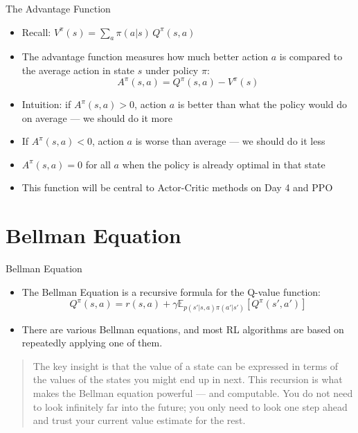 \begin{frame}{The Advantage Function}
\begin{itemize}
    \item Recall: $V^{\pi}(s) = \sum_a \pi(a|s)\, Q^{\pi}(s,a)$
    \item The advantage function measures how much better action $a$ is compared to the average action in state $s$ under policy $\pi$:
    $$A^{\pi}(s,a) = Q^{\pi}(s,a) - V^{\pi}(s)$$
    \item Intuition: if $A^{\pi}(s,a) > 0$, action $a$ is better than what the policy would do on average --- we should do it more
    \item If $A^{\pi}(s,a) < 0$, action $a$ is worse than average --- we should do it less
    \item $A^{\pi}(s,a) = 0$ for all $a$ when the policy is already optimal in that state
    \item This function will be central to Actor-Critic methods on Day 4 and PPO
\end{itemize}
\end{frame}

\section{Bellman Equation}
\begin{frame}{Bellman Equation}
\begin{itemize}
    \item The Bellman Equation is a recursive formula for the Q-value function:
$$Q^{\pi}(s,a) =  r(s,a) + \gamma \mathbb{E}_{p(s'|s, a)\pi(a'|s')}\left [ Q^{\pi}(s',a') \right ]$$
    \item There are various Bellman equations, and most RL algorithms are based on repeatedly applying one of them.
\end{itemize}

\vspace{1em}
\begin{quote}
\small The key insight is that the value of a state can be expressed in terms of the values of the states you might end up in next. This recursion is what makes the Bellman equation powerful --- and computable. You do not need to look infinitely far into the future; you only need to look one step ahead and trust your current value estimate for the rest.
\end{quote}
    
\end{frame}

